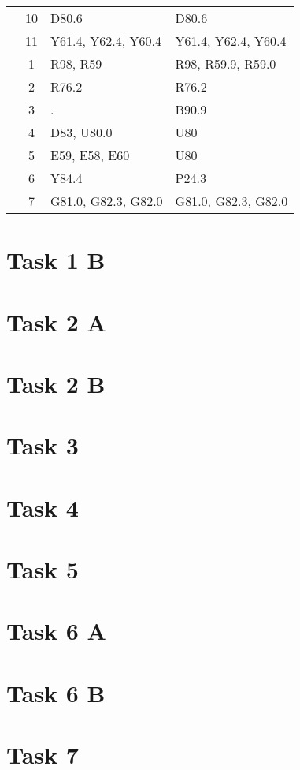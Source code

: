 \begin{table}[htbp]
\begin{tabular}{c c l l}
	 & 10 & D80.6 & D80.6 \\
	 & 11 & Y61.4, Y62.4, Y60.4 & Y61.4, Y62.4, Y60.4 \\
	\addlinespace
	6 & 1 & R98, R59 & R98, R59.9, R59.0 \\
	 & 2 & R76.2 & R76.2 \\
	 & 3 & . & B90.9 \\
	 & 4 & D83, U80.0 & U80 \\
	 & 5 & E59, E58, E60 & U80 \\
	 & 6 & Y84.4 & P24.3 \\
	 & 7 & G81.0, G82.3, G82.0 & G81.0, G82.3, G82.0 \\
	\bottomrule
\end{tabular}
\end{table}


\section{Task 1 B}


\section{Task 2 A}


\section{Task 2 B}


\section{Task 3}


\section{Task 4}


\section{Task 5}


\section{Task 6 A}


\section{Task 6 B}


\section{Task 7}


